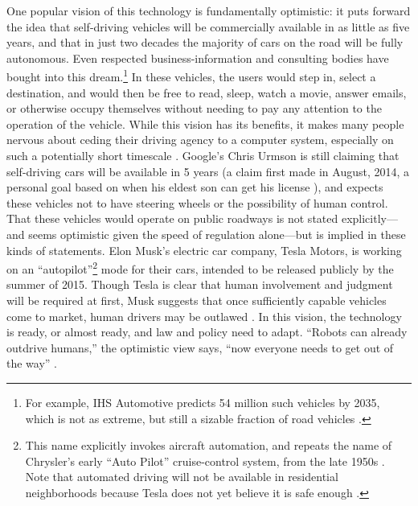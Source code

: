 
One popular vision of this technology is fundamentally optimistic: it
puts forward the
idea that self-driving vehicles will be commercially available in as little
as five years, and that in just two decades the majority of cars on the road will be
fully autonomous. Even respected business-information and consulting
bodies have bought into this dream.\footnote{For example,
  IHS Automotive
  predicts 54 million such vehicles by 2035, which is not as extreme,
  but still a sizable fraction of road vehicles \cite{IHSstudy}.} In
these vehicles, the users would 
step in, select a destination, and would then be free to read, sleep,
watch a movie, answer emails, or otherwise occupy themselves without
needing to pay any attention to the operation of the vehicle. While this
vision has its benefits, it makes many people nervous about
ceding their driving agency to a computer system, especially on such a
potentially short timescale \cite{clytton}. Google's Chris Urmson is
still claiming that self-driving cars will be available in 5 years (a
claim first made in August, 2014, a personal goal based on when his
eldest son can get his license \cite{gomesObstacles}), and expects
these vehicles not to have steering wheels or the possibility of human
control. That these vehicles would operate on public roadways is not
stated explicitly---and seems optimistic given the speed of regulation
alone---but is implied in these kinds of statements. Elon Musk's
electric car company, Tesla Motors, is working on an 
``autopilot''\footnote{This name explicitly invokes aircraft
  automation, and repeats the name of Chrysler's early ``Auto Pilot''
cruise-control system, from the late 1950s
\cite{kesslerElon}. Note that automated driving will not be available
in residential neighborhoods because Tesla does not yet believe it is safe
enough \cite{slashgearDaviesT}.} mode for their cars, intended to be released publicly by
the summer of 2015.
Though Tesla is clear that human involvement and judgment will be
required at first, Musk suggests 
that once sufficiently capable vehicles 
come to market, human drivers may be
outlawed \cite{kingGoogle}.
In this vision, the technology is ready, or almost ready, and law and policy need to
adapt. ``Robots can already outdrive humans,'' the optimistic view says, ``now
everyone needs to get out of the way''
\cite{fisherInside}.




